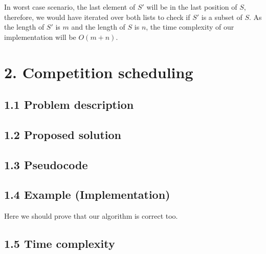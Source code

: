 \documentclass{article}
\begin{document}
In worst case scenario, the last element of $S'$ will be in the last position of $S$, therefore, we would have iterated over both lists to check if $S'$ is a subset of $S$. As the length of $S'$ is $m$ and the length of $S$ is $n$, the time complexity of our implementation will be $O(m+n)$.

\section*{2. Competition scheduling}

\subsection*{1.1 Problem description}

\subsection*{1.2 Proposed solution}

\subsection*{1.3 Pseudocode}

\subsection*{1.4 Example (Implementation)}

Here we should prove that our algorithm is correct too.

\subsection*{1.5 Time complexity}
\end{document}
